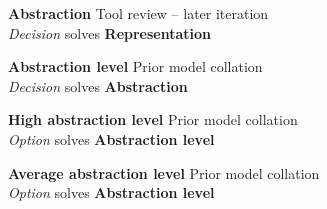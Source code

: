 \textbf{Abstraction} \hfill Tool review  -- later iteration \\ \emph{Decision} \hfill solves \textbf{Representation}

\textbf{Abstraction level} \hfill Prior model collation \cite{Grammel2010} \\ \emph{Decision} \hfill solves \textbf{Abstraction}


\textbf{High abstraction level} \hfill Prior model collation \cite{Grammel2010} \\ \emph{Option} \hfill solves \textbf{Abstraction level}

\textbf{Average abstraction level} \hfill Prior model collation \cite{Grammel2010} \\ \emph{Option} \hfill solves \textbf{Abstraction level}


